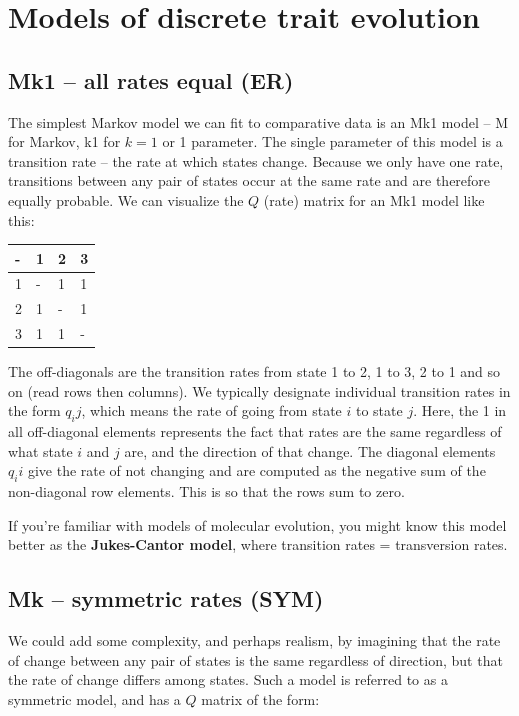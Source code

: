 \documentclass[]{book}
\begin{document}
\section{Models of discrete trait
evolution}\label{models-of-discrete-trait-evolution}

\subsection{Mk1 -- all rates equal (ER)}\label{mk1-all-rates-equal-er}

The simplest Markov model we can fit to comparative data is an Mk1 model
-- M for Markov, k1 for \(k = 1\) or 1 parameter. The single parameter
of this model is a transition rate -- the rate at which states change.
Because we only have one rate, transitions between any pair of states
occur at the same rate and are therefore equally probable. We can
visualize the \(Q\) (rate) matrix for an Mk1 model like this:

\begin{longtable}[]{@{}llll@{}}
\toprule
- & 1 & 2 & 3\tabularnewline
\midrule
\endhead
1 & - & 1 & 1\tabularnewline
2 & 1 & - & 1\tabularnewline
3 & 1 & 1 & -\tabularnewline
\bottomrule
\end{longtable}

The off-diagonals are the transition rates from state 1 to 2, 1 to 3, 2
to 1 and so on (read rows then columns). We typically designate
individual transition rates in the form \(q_ij\), which means the rate
of going from state \(i\) to state \(j\). Here, the 1 in all
off-diagonal elements represents the fact that rates are the same
regardless of what state \(i\) and \(j\) are, and the direction of that
change. The diagonal elements \(q_ii\) give the rate of not changing and
are computed as the negative sum of the non-diagonal row elements. This
is so that the rows sum to zero.

If you're familiar with models of molecular evolution, you might know
this model better as the \textbf{Jukes-Cantor model}, where transition
rates = transversion rates.

\subsection{Mk -- symmetric rates (SYM)}\label{mk-symmetric-rates-sym}

We could add some complexity, and perhaps realism, by imagining that the
rate of change between any pair of states is the same regardless of
direction, but that the rate of change differs among states. Such a
model is referred to as a symmetric model, and has a \(Q\) matrix of the
form:
\end{document}
